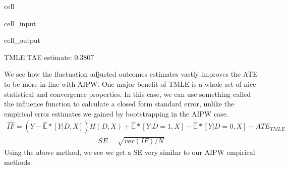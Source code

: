 \documentclass[letterpaper,10pt,english]{jupyterBook}
\begin{document}
\begin{sphinxuseclass}{cell}\begin{sphinxVerbatimInput}

\begin{sphinxuseclass}{cell_input}
\begin{sphinxVerbatim}[commandchars=\\\{\}]
  \PYG{p}{[}\PYG{p}{]}  \PYG{p}{[}\PYG{p}{]}
\end{sphinxVerbatim}

\end{sphinxuseclass}\end{sphinxVerbatimInput}
\begin{sphinxVerbatimOutput}

\begin{sphinxuseclass}{cell_output}
\begin{sphinxVerbatim}[commandchars=\\\{\}]
TMLE TAE estimate: 0.3807
\end{sphinxVerbatim}

\end{sphinxuseclass}\end{sphinxVerbatimOutput}

\end{sphinxuseclass}
\sphinxAtStartPar
We see how the fluctuation adjusted outcomes estimates vastly improves the ATE to be more in line with AIPW. One major benefit of TMLE is a whole set of nice statistical and convergence properties. In this case, we can use something called the influence function to calculate a closed form standard error, unlike the empirical error estimates we gained by bootstrapping in the AIPW case.
\begin{equation*}
\begin{split}\hat{IF} = (Y-\hat{\mathbb{E}}*[Y|D,X])H(D,X) + \hat{\mathbb{E}}*[Y|D=1,X] - \hat{\mathbb{E}}*[Y|D=0,X] - ATE_{TMLE}\end{split}
\end{equation*}\begin{equation*}
\begin{split}SE = \sqrt{var(IF)/N}\end{split}
\end{equation*}
\sphinxAtStartPar
Using the above method, we see we get a SE very similar to our AIPW empirical methods.
\end{document}
